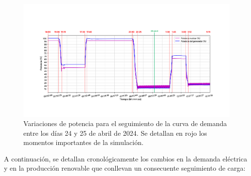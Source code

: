 \begin{figure}[!h]
  \centering
  \includegraphics[width=\textwidth]{content/figures/sim4_potencias_contextualizacion.pdf}
  \caption{Variaciones de potencia para el seguimiento de la curva de demanda entre los días 24 y 25 de abril de 2024. Se detallan en rojo los momentos importantes de la simulación.}
  \label{fig:sim4_potencias_contextualizacion}
\end{figure}

A continuación, se detallan cronológicamente los cambios en la demanda eléctrica y en la producción renovable que conllevan un consecuente seguimiento de carga:

